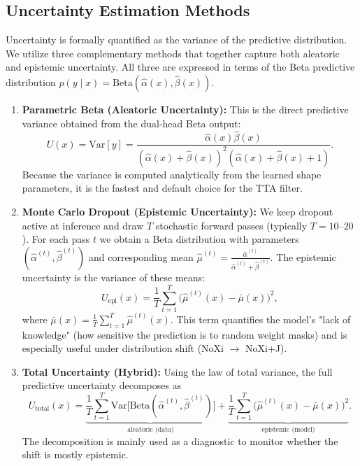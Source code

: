 \documentclass[11pt,a4paper]{article}
\begin{document}
	\subsection{Uncertainty Estimation Methods}
	
	Uncertainty is formally quantified as the variance of the predictive distribution. We utilize three complementary methods that together capture both aleatoric and epistemic uncertainty. All three are expressed in terms of the Beta predictive distribution $p(y \mid x) = \mathrm{Beta}(\hat{\alpha}(x),\hat{\beta}(x))$.
	
	\begin{enumerate}
		\item \textbf{Parametric Beta (Aleatoric Uncertainty):}  
		This is the direct predictive variance obtained from the dual-head Beta output:
		$$
		U(x) = \mathrm{Var}[y] = \frac{\hat{\alpha}(x)\hat{\beta}(x)}{(\hat{\alpha}(x)+\hat{\beta}(x))^2(\hat{\alpha}(x)+\hat{\beta}(x)+1)}.
		$$
		Because the variance is computed analytically from the learned shape parameters, it is the fastest and default choice for the TTA filter.
		
		\item \textbf{Monte Carlo Dropout (Epistemic Uncertainty):}  
		We keep dropout active at inference and draw $T$ stochastic forward passes (typically $T=10$--$20$). For each pass $t$ we obtain a Beta distribution with parameters $(\hat{\alpha}^{(t)},\hat{\beta}^{(t)})$ and corresponding mean $\displaystyle \hat{\mu}^{(t)} = \frac{\hat{\alpha}^{(t)}}{\hat{\alpha}^{(t)}+\hat{\beta}^{(t)}}$.  
		The epistemic uncertainty is the variance of these means:
		$$
		U_{\text{epi}}(x) = \frac{1}{T}\sum_{t=1}^T \bigl(\hat{\mu}^{(t)}(x) - \bar{\mu}(x)\bigr)^2,
		$$
		where $\bar{\mu}(x) = \frac{1}{T}\sum_{t=1}^T \hat{\mu}^{(t)}(x)$. This term quantifies the model's "lack of knowledge" (how sensitive the prediction is to random weight masks) and is especially useful under distribution shift (NoXi $\to$ NoXi+J).
		
		\item \textbf{Total Uncertainty (Hybrid):}  
		Using the law of total variance, the full predictive uncertainty decomposes as
		$$
		U_{\text{total}}(x) = \underbrace{\frac{1}{T}\sum_{t=1}^T \mathrm{Var}\bigl[\mathrm{Beta}(\hat{\alpha}^{(t)},\hat{\beta}^{(t)})\bigr]}_{\text{aleatoric (data)}} 
		+ \underbrace{\frac{1}{T}\sum_{t=1}^T \bigl(\hat{\mu}^{(t)}(x) - \bar{\mu}(x)\bigr)^2}_{\text{epistemic (model)}}.
		$$
		The decomposition is mainly used as a diagnostic to monitor whether the shift is mostly epistemic.
	\end{enumerate}
	
\end{document}
